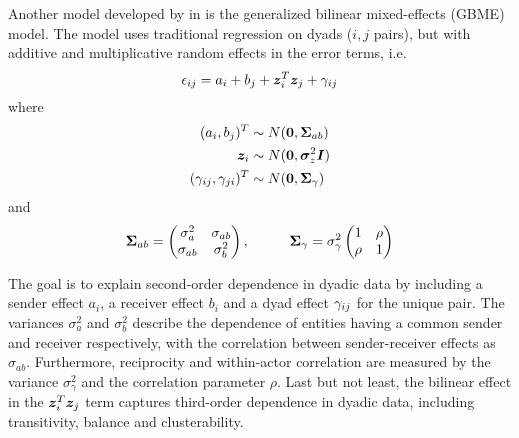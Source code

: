         Another model developed by \citeauthor{hoff2009bilinear} in \cite{hoff2009bilinear} is the generalized bilinear mixed-effects (GBME) model. The model uses traditional regression on dyads ($i,j$ pairs), but with additive and multiplicative random effects in the error terms, i.e.
        \begin{equation}
            \sub(\epsilon) = a_i + b_j + \z_i^T\z_j + \sub(\gamma)
        \end{equation}
        where
        \begin{equation}
            \begin{split}
                (a_i,b_j)^T &\sim N(\bm{0},\bmSigma_{ab}) \\
                \z_i &\sim N(\bm{0},\bmsigma_z^2\bm{I}) \\
                (\sub(\gamma),\sub(\gamma)(ji))^T &\sim N(\bm{0}, \bmSigma_\gamma)
            \end{split}
        \end{equation}
        and
        \begin{equation}
            \bm{\Sigma}_{ab} = 
                \begin{pmatrix}
                    \sigma_a^2 & \sigma_{ab} \\
                    \sigma_{ab} & \sigma_b^2 \\
                \end{pmatrix},
            \hspace{1cm}
            \bm{\Sigma}_\gamma = \sigma_\gamma^2
                \begin{pmatrix}
                    1 & \rho \\
                    \rho & 1 \\
                \end{pmatrix}
        \end{equation}
        
        The goal is to explain second-order dependence in dyadic data by including a sender effect $a_i$, a receiver effect $b_i$ and a dyad effect $\sub(\gamma)$ for the unique pair. The variances $\sigma_a^2$ and $\sigma_b^2$ describe the dependence of entities having a common sender and receiver respectively, with the correlation between sender-receiver effects as $\sigma_{ab}$. Furthermore, reciprocity and within-actor correlation are measured by the variance $\sigma_\gamma^2$ and the correlation parameter $\rho$. Last but not least, the bilinear effect in the $\bm{z}_i^T\bm{z}_j$ term captures third-order dependence in dyadic data, including transitivity, balance and clusterability.
        
